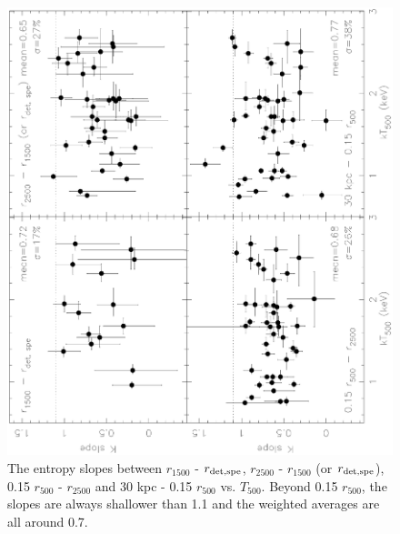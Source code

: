 \documentclass{aastex}
\begin{document}
\begin{figure}
\centerline{\includegraphics[height=0.8\linewidth,angle=270]{f14.ps}}
  \caption{The entropy slopes between $r_{1500}$ - $r_{\rm det, spe}$, $r_{2500}$ - $r_{1500}$
(or $r_{\rm det, spe}$), 0.15 $r_{500}$ - $r_{2500}$ and 30 kpc - 0.15 $r_{500}$ vs. $T_{500}$.
Beyond 0.15 $r_{500}$, the slopes are always shallower than 1.1 and the weighted averages
are all around 0.7.
}
\end{figure}
\end{document}
